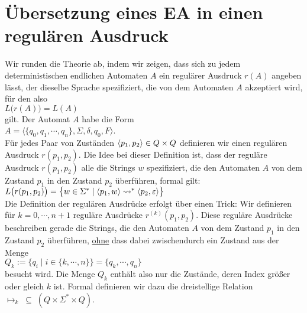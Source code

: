 \vspace*{\fill}
\pagebreak



\section{\"Ubersetzung eines \textsc{EA} in einen regul\"aren Ausdruck}
Wir runden die Theorie ab, indem wir zeigen, dass sich zu jedem deterministischen endlichen
Automaten $A$ ein regul\"arer Ausdruck $r(A)$ angeben l\"asst, der dieselbe Sprache spezifiziert,
die von dem Automaten $A$ akzeptiert wird, f\"ur den also
\\[0.2cm]
\hspace*{1.3cm}
$L\bigl(r(A)\bigr) = L(A)$
\\[0.2cm]
gilt.  Der  Automat $A$ habe die Form
\\[0.2cm]
\hspace*{1.3cm}
$A = \langle \{ q_0, q_1, \cdots, q_n \}, \Sigma, \delta, q_0, F \rangle$.
\\[0.2cm]
F\"ur jedes Paar von Zust\"anden $\pair(p_1,p_2) \in Q \times Q$ definieren wir einen regul\"aren Ausdruck
$r(p_1, p_2)$.   Die Idee bei dieser Definition ist, dass der regul\"are Ausdruck
$r(p_1, p_2)$ alle die Strings $w$ spezifiziert, die den Automaten $A$ von dem Zustand
$p_1$ in den Zustand $p_2$ \"uberf\"uhren, formal gilt:
\\[0.2cm]
\hspace*{1.3cm}
$L\bigl(r(p_1, p_2)\bigr) = 
  \bigl\{ w \in \Sigma^* \mid \pair(p_1,w) \leadsto^* \pair(p_2, \varepsilon) \bigr\}$
\\[0.2cm]  
Die Definition der regul\"aren Ausdr\"ucke erfolgt \"uber einen Trick: Wir definieren f\"ur
$k=0,\cdots,n+1$ regul\"are Ausdr\"ucke $r^{(k)}(p_1, p_2)$.   Diese regul\"are Ausdr\"ucke
beschreiben gerade die Strings, die den Automaten $A$ von dem Zustand
$p_1$ in den Zustand $p_2$ \"uberf\"uhren, \underline{ohne} dass dabei zwischendurch ein
Zustand aus der Menge 
\\[0.2cm]
\hspace*{1.3cm}
$Q_k := \bigl\{ q_i \mid i \in \{k,\cdots,n \}  \bigl\} = \{ q_k, \cdots, q_n \}$ 
\\[0.2cm]
besucht wird.  Die Menge $Q_k$ enth\"alt also nur die Zust\"ande, deren Index gr\"o{\ss}er oder
gleich $k$ ist.  Formal definieren wir dazu die dreistellige Relation 
\\[0.2cm]
\hspace*{1.3cm}
$\mapsto_k \;\subseteq\; (Q \times \Sigma^* \times Q)$.

